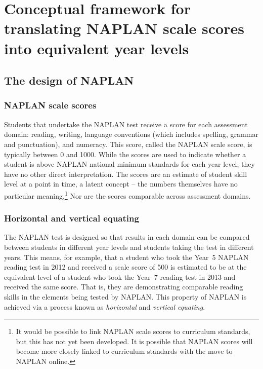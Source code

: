\chapter{Conceptual framework for translating NAPLAN scale scores into equivalent year levels} \label{chap1}

\section{The design of NAPLAN}

\subsection{NAPLAN scale scores}

Students that undertake the NAPLAN test receive a score for each assessment domain: reading, writing, language conventions (which includes spelling, grammar and punctuation), and numeracy. This score, called the NAPLAN scale score, is typically between 0 and 1000. While the scores are used to indicate whether a student is above NAPLAN national minimum standards for each year level, they have no other direct interpretation. The scores are an estimate of student skill level at a point in time, a latent concept -- the numbers themselves have no particular meaning.\footnote{It would be possible to link NAPLAN scale scores to curriculum standards, but this has not yet been developed. It is possible that NAPLAN scores will become more closely linked to curriculum standards with the move to NAPLAN online.} Nor are the scores comparable across assessment domains.

\subsection{Horizontal and vertical equating}

The NAPLAN test is designed so that results in each domain  can be compared between students in different year levels and students taking the test in different years. This means, for example, that a student who took the \mbox{Year 5} NAPLAN reading test in 2012 and received a scale score of 500 is estimated to be at the equivalent level of a student who took the \mbox{Year 7} reading test in 2013 and received the same score. That is, they are demonstrating comparable reading skills in the elements being tested by NAPLAN. This property of NAPLAN is achieved via a process known as \textit{horizontal} and \textit{vertical equating}.


